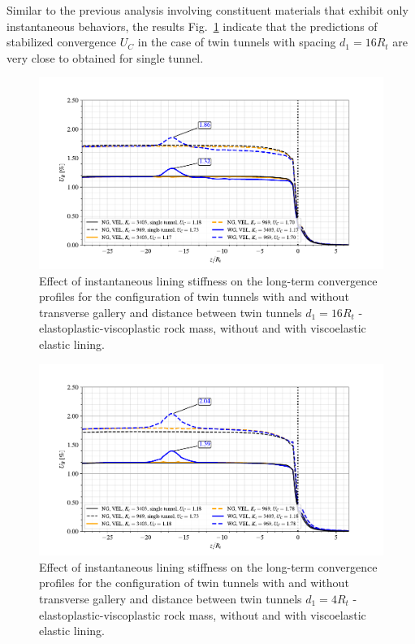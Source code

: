 \documentclass[a4paper,fleqn]{cas-sc}
\begin{document}
Similar to the previous analysis involving constituent materials that exhibit only instantaneous behaviors, the results Fig.~\ref{EPVP_VEL_d1_16Ri} indicate that the predictions of stabilized convergence $U_C$ in the case of twin tunnels with spacing $d_1=16R_t$ are very close to obtained for single tunnel.

\begin{figure}[h!]
	\centering
	\includegraphics[scale=0.9]{Convergence Profiles - EPVP_VEL_d1_16Ri_anotate.pdf}
	\caption{Effect of instantaneous lining stiffness on the long-term convergence profiles for the configuration of twin tunnels with and without transverse gallery and distance between twin tunnels $d_1=16R_t$ - elastoplastic-viscoplastic rock mass, without and with viscoelastic elastic lining.}
	\label{EPVP_VEL_d1_16Ri}
\end{figure}
\FloatBarrier
\begin{figure}[h!]
	\centering
	\includegraphics[scale=0.9]{Convergence Profiles - EPVP_VEL_d1_4Ri_anotate.pdf}
	\caption{Effect of instantaneous lining stiffness on the long-term convergence profiles for the configuration of twin tunnels with and without transverse gallery and distance between twin tunnels $d_1=4R_t$ - elastoplastic-viscoplastic rock mass, without and with viscoelastic elastic lining.}
	\label{EPVP_VEL_d1_4Ri}
\end{figure}
\FloatBarrier
\end{document}
